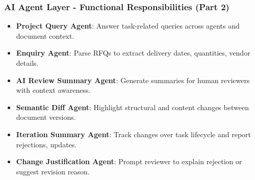 \begin{frame}
    \frametitle{AI Agent Layer - Functional Responsibilities (Part 2)}
    \begin{itemize}
        \item \textbf{Project Query Agent}: Answer task-related queries across agents and document context.
        \item \textbf{Enquiry Agent}: Parse RFQs to extract delivery dates, quantities, vendor details.
        \item \textbf{AI Review Summary Agent}: Generate summaries for human reviewers with context awareness.
        \item \textbf{Semantic Diff Agent}: Highlight structural and content changes between document versions.
        \item \textbf{Iteration Summary Agent}: Track changes over task lifecycle and report rejections, updates.
        \item \textbf{Change Justification Agent}: Prompt reviewer to explain rejection or suggest revision reason.
    \end{itemize}
\end{frame}


